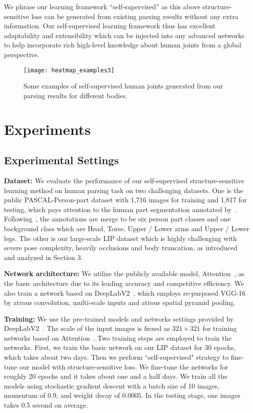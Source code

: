 \documentclass[10pt,twocolumn,letterpaper]{article}
\begin{document}
We phrase our learning framework ``self-supervised'' as this above structure-sensitive loss can be generated from existing parsing results without any extra information. Our self-supervised learning framework thus has excellent adaptability and extensibility which can be injected into any advanced networks to help incorporate rich
high-level knowledge about human joints from a global perspective. 
\begin{figure}[t]
\centering
\texttt{[image: heatmap\_examples3]}
\vspace{-3mm}
\caption{Some examples of self-supervised human joints generated from our parsing results for different bodies.}
\vspace{-4mm}
\label{fig:heatmap_example}
\end{figure}

\section{Experiments}
\subsection{Experimental Settings}
\textbf{Dataset: }
We evaluate the performance of our self-supervised structure-sensitive learning method on human parsing task on two challenging datasets. One is the public PASCAL-Person-part dataset with 1,716 images for training and 1,817 for testing, which pays attention to the human part segmentation annotated by~\cite{chen2014detect}. Following~\cite{chen2015attention,xia2015zoom}, the annotations are merge to be six person part classes and one background class which are Head, Torse, Upper / Lower arms and Upper / Lower legs. The other is our large-scale LIP dataset which is highly challenging with severe pose complexity, heavily occlusions and body truncation, as introduced and analyzed in Section 3.

\textbf{Network architecture: }
We utilize the publicly available model, Attention~\cite{chen2015attention}, as the basic architecture due to its leading accuracy and competitive efficiency. We also train a network based on DeepLabV2~\cite{chen2014semantic}, which employs re-purposed VGG-16 by atrous convolution, multi-scale inputs and atrous spatial pyramid pooling.

\textbf{Training: }
We use the pre-trained models and networks settings provided by DeepLabV2~\cite{chen2014semantic}. The scale of the input images is fiexed as $321 \times 321$ for training networks based on Attention~\cite{chen2015attention}. Two training steps are employed to train the networks. First, we train the basic network on our LIP dataset for 30 epochs, which takes about two days. Then we perform ``self-supervised" strategy to fine-tune our model with structure-sensitive loss. We fine-tune the networks for roughly 20 epochs and it takes about one and a half days. We train all the models using stochastic gradient descent with a batch size of 10 images, momentum of 0.9, and weight decay of 0.0005. In the testing stage, one images takes 0.5 second on average.
\end{document}
